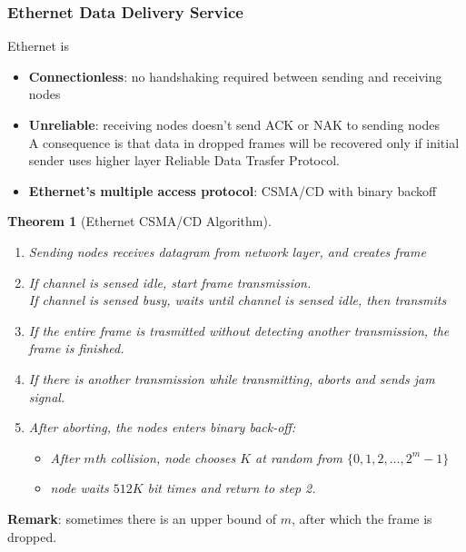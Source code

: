 \documentclass[12pt]{article}
\newtheorem{theorem}{Theorem}[section]
\theoremstyle{definition}
\begin{document}
\subsubsection{Ethernet Data Delivery Service}
Ethernet is
\begin{itemize}
  \item \textbf{Connectionless}: no handshaking required between sending and receiving nodes
  \item \textbf{Unreliable}: receiving nodes doesn't send ACK or NAK to sending nodes\\
  A consequence is that data in dropped frames will be recovered only if initial sender uses higher layer Reliable Data Trasfer Protocol.
  \item \textbf{Ethernet's multiple access protocol}: CSMA/CD with binary backoff
\end{itemize}
\begin{theorem}[Ethernet CSMA/CD Algorithm]
\hfill\\\normalfont
\begin{enumerate}
  \item Sending nodes receives datagram from network layer, and creates frame
  \item If channel is sensed idle, start frame transmission.\\If channel is sensed busy, waits until channel is sensed idle, then transmits
  \item If the entire frame is trasmitted without detecting another transmission, the frame is finished.
  \item If there is another transmission while transmitting, aborts and sends jam signal.
  \item After aborting, the nodes enters binary back-off:
  \begin{itemize}
    \item After $m$th collision, node chooses $K$ at random from $\{0,1,2,\ldots, 2^m-1\}$
    \item node waits $512K$ bit times and return to step 2.
  \end{itemize}
\end{enumerate}
\end{theorem}
\textbf{Remark}: sometimes there is an upper bound of $m$, after which the frame is dropped.
\end{document}
